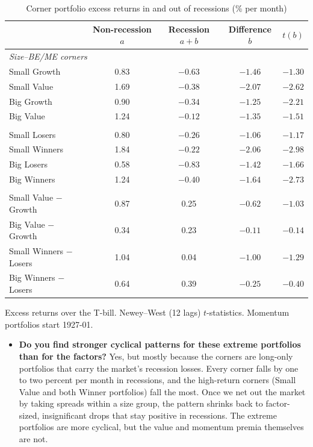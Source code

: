 \documentclass[11pt]{article}
\newenvironment{tight}
  {\begin{itemize}\setlength{\itemsep}{3pt}\setlength{\parskip}{0pt}%
   \setlength{\topsep}{3pt}\setlength{\leftmargini}{1.4em}}
  {\end{itemize}}
\begin{document}
\begin{table}[H]\centering\small
\caption{Corner portfolio excess returns in and out of recessions (\% per month)}
\begin{tabular}{lcccc}
\toprule
 & Non-recession $a$ & Recession $a+b$ & Difference $b$ & $t(b)$ \\
\midrule
\multicolumn{5}{l}{\textit{Size--BE/ME corners}} \\
Small Growth & 0.83 & $-0.63$ & $-1.46$ & $-1.30$ \\
Small Value  & 1.69 & $-0.38$ & $-2.07$ & $-2.62$ \\
Big Growth   & 0.90 & $-0.34$ & $-1.25$ & $-2.21$ \\
Big Value    & 1.24 & $-0.12$ & $-1.35$ & $-1.51$ \\
\addlinespace
\multicolumn{5}{l}{\textit{Size--momentum corners}} \\
Small Losers  & 0.80 & $-0.26$ & $-1.06$ & $-1.17$ \\
Small Winners & 1.84 & $-0.22$ & $-2.06$ & $-2.98$ \\
Big Losers    & 0.58 & $-0.83$ & $-1.42$ & $-1.66$ \\
Big Winners   & 1.24 & $-0.40$ & $-1.64$ & $-2.73$ \\
\addlinespace
\multicolumn{5}{l}{\textit{Within-size spreads}} \\
Small Value $-$ Growth   & 0.87 & 0.25 & $-0.62$ & $-1.03$ \\
Big Value $-$ Growth     & 0.34 & 0.23 & $-0.11$ & $-0.14$ \\
Small Winners $-$ Losers & 1.04 & 0.04 & $-1.00$ & $-1.29$ \\
Big Winners $-$ Losers   & 0.64 & 0.39 & $-0.25$ & $-0.40$ \\
\bottomrule
\end{tabular}
\par\smallskip\footnotesize Excess returns over the T-bill. Newey--West (12 lags)
$t$-statistics. Momentum portfolios start 1927-01.
\end{table}

\begin{tight}
  \item \textbf{Do you find stronger cyclical patterns for these extreme portfolios
  than for the factors?} Yes, but mostly because the corners are long-only portfolios that
  carry the market's recession losses. Every corner falls by one to two percent per
  month in recessions, and the high-return corners (Small Value and both
  Winner portfolios) fall the most. Once we net out the market by taking
  spreads within a size group, the pattern shrinks back to factor-sized, insignificant
  drops that stay positive in recessions. The extreme portfolios are more cyclical,
  but the value and momentum premia themselves are not.
\end{tight}
\end{document}

